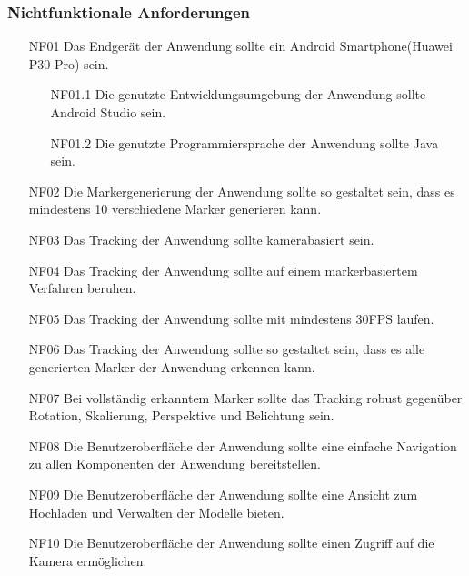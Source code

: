 \subsubsection{Nichtfunktionale Anforderungen}
\begin{itemize}
\item[NF01] Das Endgerät der Anwendung sollte ein Android Smartphone(Huawei P30 Pro) sein.
\begin{enumerate}
\item[NF01.1] Die genutzte Entwicklungsumgebung der Anwendung sollte Android Studio sein.
\item[NF01.2] Die genutzte Programmiersprache der Anwendung sollte Java sein.
\end{enumerate}
\item[NF02] Die Markergenerierung der Anwendung sollte so gestaltet sein, dass es mindestens 10 verschiedene Marker generieren kann.
\item[NF03] Das Tracking der Anwendung sollte kamerabasiert sein.
\item[NF04] Das Tracking der Anwendung sollte auf einem markerbasiertem Verfahren beruhen.
\item[NF05] Das Tracking der Anwendung sollte mit mindestens 30FPS laufen.
\item[NF06] Das Tracking der Anwendung sollte so gestaltet sein, dass es alle generierten Marker der Anwendung erkennen kann.
\item[NF07] Bei vollständig erkanntem Marker sollte das Tracking robust gegenüber Rotation, Skalierung, Perspektive und Belichtung sein.

\item[NF08] Die Benutzeroberfläche der Anwendung sollte eine einfache Navigation zu allen Komponenten der Anwendung bereitstellen.
\item[NF09] Die Benutzeroberfläche der Anwendung sollte eine Ansicht zum Hochladen und Verwalten der Modelle bieten.
\item[NF10] Die Benutzeroberfläche der Anwendung sollte einen Zugriff auf die Kamera ermöglichen.








\end{itemize}

